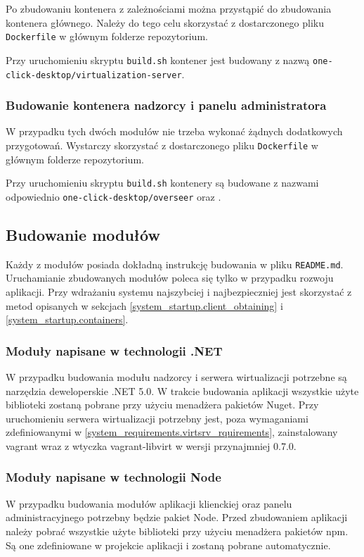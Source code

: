 \documentclass[../opis-rozwiazania.tex]{subfiles}
\begin{document}
Po zbudowaniu kontenera z zależnościami można przystąpić do zbudowania kontenera głównego.
Należy do tego celu skorzystać z dostarczonego pliku \texttt{Dockerfile} w głównym folderze repozytorium.

Przy uruchomieniu skryptu \texttt{build.sh} kontener jest budowany z nazwą \texttt{one-click-desktop/virtualization-server}.

\subsubsection{Budowanie kontenera nadzorcy i panelu administratora}
W przypadku tych dwóch modułów nie trzeba wykonać żądnych dodatkowych przygotowań.
Wystarczy skorzystać z dostarczonego pliku \texttt{Dockerfile} w głównym folderze repozytorium.

Przy uruchomieniu skryptu \texttt{build.sh} kontenery są budowane z nazwami odpowiednio \texttt{one-click-desktop/overseer} oraz \texttt{}.

\subsection{Budowanie modułów}
Każdy z modułów posiada dokładną instrukcję budowania w pliku \texttt{README.md}.
Uruchamianie zbudowanych modułów poleca się tylko w przypadku rozwoju aplikacji.
Przy wdrażaniu systemu najszybciej i najbezpieczniej jest skorzystać z metod opisanych w sekcjach \ref{system_startup.client_obtaining} i \ref{system_startup.containers}.

\subsubsection{Moduły napisane w technologii .NET}
W przypadku budowania modułu nadzorcy i serwera wirtualizacji potrzebne są narzędzia deweloperskie .NET 5.0.
W trakcie budowania aplikacji wszystkie użyte biblioteki zostaną pobrane przy użyciu menadżera pakietów Nuget.
Przy uruchomieniu serwera wirtualizacji potrzebny jest, poza wymaganiami zdefiniowanymi w \ref{system_requirements.virtsrv_rquirements}, zainstalowany vagrant wraz z wtyczka vagrant-libvirt w wersji przynajmniej 0.7.0.

\subsubsection{Moduły napisane w technologii Node}
W przypadku budowania modułów aplikacji klienckiej oraz panelu administracyjnego potrzebny będzie pakiet Node.
Przed zbudowaniem aplikacji należy pobrać wszystkie użyte biblioteki przy użyciu menadżera pakietów npm.
Są one zdefiniowane w projekcie aplikacji i zostaną pobrane automatycznie.
\end{document}
